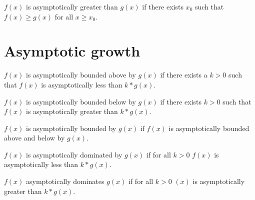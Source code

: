 \begin{definition}
    \label{def:asymp_ge}
    \leanok
    $f(x)$ is asymptotically greater than $g(x)$ if there exists $x_0$ such that
    $f(x) \ge g(x)$ for all $x \ge x_0$.

\end{definition}


\section{Asymptotic growth}

\begin{definition}
    \label{def:asymp_bounded_above}
    \leanok
    $f(x)$ is asymptotically bounded above by $g(x)$ if there exists a $k > 0$ 
    such that $f(x)$ is asymptotically less than $k*g(x)$.
\end{definition}

\begin{definition}
    \label{def:asymp_bounded_below}
    \leanok
    $f(x)$ is asymptotically bounded below by $g(x)$ if there exists $k > 0$ 
    such that $f(x)$ is asymptotically greater than $k*g(x)$.
\end{definition}

\begin{definition}
    \label{def:asymp_bounded}
    \leanok
    $f(x)$ is asymptotically bounded by $g(x)$ if $f(x)$ is asymptotically bounded
    above and below by $g(x)$.
\end{definition}

\begin{definition}
    \label{def:asymp_right_dom}
    \leanok
    $f(x)$ is asymptotically dominated by $g(x)$ if for all $k > 0$ $f(x)$ is asymptotically 
    less than $k*g(x)$.

\end{definition}

\begin{definition}
    \label{def:asymp_left_dom}
    \leanok
    $f(x)$ asymptotically dominates $g(x)$ if for all $k > 0$ $(x)$ is asymptotically
    greater than $k*g(x)$.

\end{definition}

